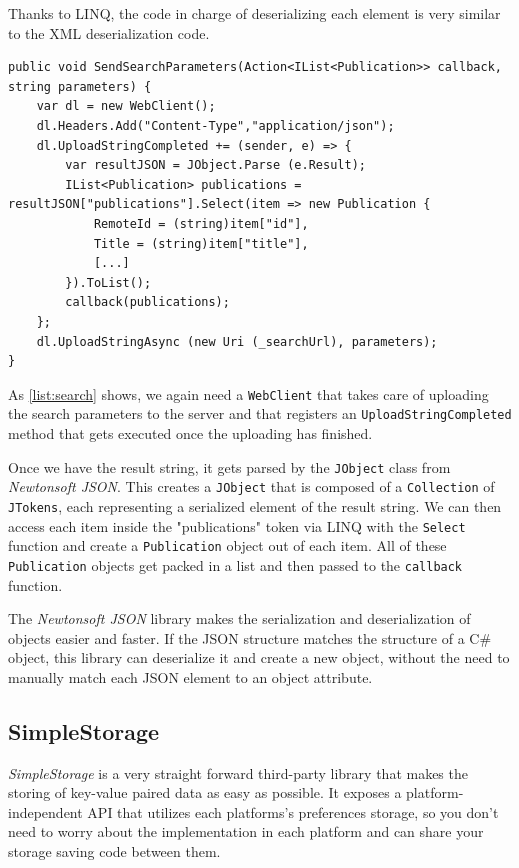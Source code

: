 Thanks to \ac{LINQ}, the code in charge of deserializing each element is very similar to the \ac{XML} deserialization code.

\begin{lstlisting}[frame=lt,caption=Publication Search,label={list:search}]
public void SendSearchParameters(Action<IList<Publication>> callback, string parameters) {
	var dl = new WebClient();
	dl.Headers.Add("Content-Type","application/json");
	dl.UploadStringCompleted += (sender, e) => {
		var resultJSON = JObject.Parse (e.Result);
		IList<Publication> publications = resultJSON["publications"].Select(item => new Publication	{
			RemoteId = (string)item["id"],
			Title = (string)item["title"],
			[...]				
		}).ToList();
		callback(publications);
	};
	dl.UploadStringAsync (new Uri (_searchUrl), parameters);		
}
\end{lstlisting}

As \autoref{list:search} shows, we again need a \texttt{WebClient} that takes care of uploading the search parameters to the server and that registers an \texttt{UploadStringCompleted} method that gets executed once the uploading has finished.

Once we have the result string, it gets parsed by the \texttt{JObject} class from \textit{Newtonsoft JSON}. This creates a \texttt{JObject} that is composed of a \texttt{Collection} of \texttt{JTokens}, each representing a serialized element of the result string. We can then access each item inside the "publications" token via \ac{LINQ} with the \texttt{Select} function and create a \texttt{Publication} object out of each item. All of these \texttt{Publication} objects get packed in a list and then passed to the \texttt{callback} function.

The \textit{Newtonsoft JSON} library makes the serialization and deserialization of objects easier and faster. If the \ac{JSON} structure matches the structure of a C\# object, this library can deserialize it and create a new object, without the need to manually match each \ac{JSON} element to an object attribute.
 

\subsection{SimpleStorage}
\textit{SimpleStorage} is a very straight forward third-party library that makes the storing of key-value paired data as easy as possible. It exposes a platform-independent \ac{API} that utilizes each platforms's preferences storage, so you don't need to worry about the implementation in each platform and can share your storage saving code between them.

